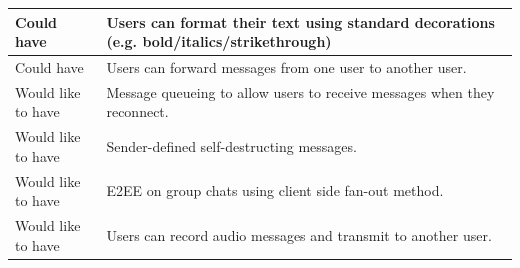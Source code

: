 \documentclass{mproj}
\begin{document}
\begin{longtable}{|p{2.5cm}|p{11cm}|}
	\hline
	Could have & Users can format their text using standard decorations (e.g. bold/italics/strikethrough)\\
	\hline
	Could have & Users can forward messages from one user to another user.\\
	\hline
	Would like to have & Message queueing to allow users to receive messages when they reconnect.\\
	\hline
	Would like to have & Sender-defined self-destructing messages.\\
	\hline
	Would like to have & E2EE on group chats using client side fan-out method.\\
	\hline
	Would like to have & Users can record audio messages and transmit to another user.\\
	\hline
\end{longtable}
\end{document}
